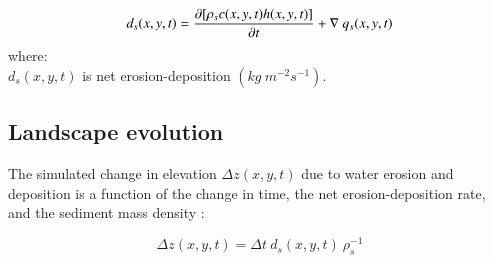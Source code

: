 \documentclass[final,3p,times,twocolumn]{elsarticle}
\begin{document}
\begin{equation}\label{eq:sediment} 
d_s(x,y,t) = 
{\partial [\rho_sc(x,y,t)h(x,y,t)] \over \partial t} +
\nabla ~ q_s(x,y,t)
\end{equation}
%
{\small
\noindent
where: \\
\hspace*{0.5em} $d_s(x,y,t)$ is net erosion-deposition $(kg ~ m^{-2} s^{-1})$.\\
}




\subsection{Landscape evolution}
The simulated change in elevation $\Delta z(x,y,t)$ due to water erosion and deposition
is a function of
the change in time, the net erosion-deposition rate, and the sediment mass density 
\cite{Mitasova2013}:

\begin{equation}
\label{eq:evolution} 
{\Delta z(x,y,t) = \Delta t ~ d_s(x,y,t) ~ \rho_s^{-1} }
\end{equation}

\end{document}
